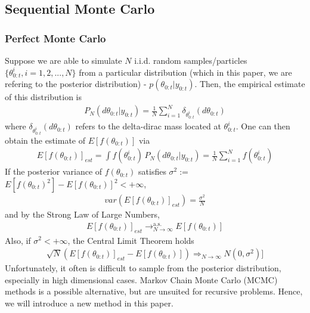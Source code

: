 \documentclass[11pt]{article}
\theoremstyle{definition}
\begin{document}
\subsection{Sequential Monte Carlo}
\subsubsection{Perfect Monte Carlo}
Suppose we are able to simulate $N$ i.i.d. random samples/particles $\{\theta_{0:t}^{i},i=1,2,...,N\}$ from a particular distribution (which in this paper, we are refering to the posterior distribution) - $p(\theta_{0:t}|y_{0:t})$. Then, the empirical estimate of this distribution is
\begin{equation}
	\begin{aligned}
		P_{N}(d\theta_{0:t}|y_{0:t}) = \frac{1}{N}\sum_{i=1}^{N}\delta_{\theta_{0:t}^{i}}(d\theta_{0:t})
	\end{aligned}
\end{equation}
where $\delta_{\theta_{0:t}^{i}}(d\theta_{0:t})$ refers to the delta-dirac mass located at $\theta_{0:t}^{i}$. One can then obtain the estimate of $E[f(\theta_{0:t})]$ via
\begin{equation}
	\begin{aligned}
		E[f(\theta_{0:t})]_{est} = \int f(\theta_{0:t}^{i}) \,P_{N}(d\theta_{0:t}|y_{0:t}) = \frac{1}{N}\sum_{i=1}^{N}f(\theta_{0:t}^{i})
	\end{aligned}
\end{equation}
If the posterior variance of $f(\theta_{0:t})$ satisfies \(\sigma^{2} :=\) $E[f(\theta_{0:t})^{2}] - E[f(\theta_{0:t})]^{2} < + \infty $, 
\begin{equation}
	\begin{aligned}
		var(E[f(\theta_{0:t})]_{est}) = \frac{\sigma^{2}}{N}
	\end{aligned}
\end{equation}
and by the Strong Law of Large Numbers,
\begin{equation}
	\begin{aligned}
		E[f(\theta_{0:t})]_{est} \mathrel{\mathop{\rightarrow}^{\mathrm{a.s.}}_{N \rightarrow \infty}} E[f(\theta_{0:t})]
	\end{aligned}
\end{equation}
Also, if $\sigma^{2} < +\infty$, the Central Limit Theorem holds
\begin{equation}
	\begin{aligned}
		\sqrt{N}(E[f(\theta_{0:t})]_{est} - E[f(\theta_{0:t})]) \mathrel{\mathop{\Longrightarrow}_{N \rightarrow \infty}} N(0,\sigma^{2})]
	\end{aligned}
\end{equation}
Unfortunately, it often is difficult to sample from the posterior distribution, especially in high dimensional cases. Markov Chain Monte Carlo (MCMC) methods is a possible alternative, but are unsuited for recursive problems. Hence, we will introduce a new method in this paper.
\end{document}

